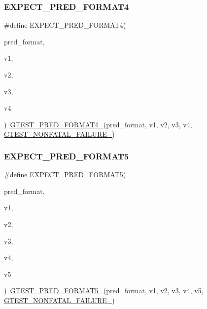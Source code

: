 \subsubsection{\texorpdfstring{EXPECT\_PRED\_FORMAT4}{EXPECT\_PRED\_FORMAT4}}
{\footnotesize\ttfamily \#define E\+X\+P\+E\+C\+T\+\_\+\+P\+R\+E\+D\+\_\+\+F\+O\+R\+M\+A\+T4(\begin{DoxyParamCaption}\item[{}]{pred\+\_\+format,  }\item[{}]{v1,  }\item[{}]{v2,  }\item[{}]{v3,  }\item[{}]{v4 }\end{DoxyParamCaption})~\mbox{\hyperlink{_obj__test_2lib_2googletest-release-1_88_81_2googletest_2include_2gtest_2gtest__pred__impl_8h_abd207ed869491ba4bba29f8df37b7355}{G\+T\+E\+S\+T\+\_\+\+P\+R\+E\+D\+\_\+\+F\+O\+R\+M\+A\+T4\+\_\+}}(pred\+\_\+format, v1, v2, v3, v4, \mbox{\hyperlink{_obj__test_2lib_2googletest-release-1_88_81_2googletest_2include_2gtest_2internal_2gtest-internal_8h_a6cb7482cfa03661a91c698eb5895f642}{G\+T\+E\+S\+T\+\_\+\+N\+O\+N\+F\+A\+T\+A\+L\+\_\+\+F\+A\+I\+L\+U\+R\+E\+\_\+}})}

\mbox{\label{_obj__test_2lib_2googletest-release-1_88_81_2googletest_2include_2gtest_2gtest__pred__impl_8h_a74beddf9661e4460f9969fe211b9e80e}} 
\subsubsection{\texorpdfstring{EXPECT\_PRED\_FORMAT5}{EXPECT\_PRED\_FORMAT5}}
{\footnotesize\ttfamily \#define E\+X\+P\+E\+C\+T\+\_\+\+P\+R\+E\+D\+\_\+\+F\+O\+R\+M\+A\+T5(\begin{DoxyParamCaption}\item[{}]{pred\+\_\+format,  }\item[{}]{v1,  }\item[{}]{v2,  }\item[{}]{v3,  }\item[{}]{v4,  }\item[{}]{v5 }\end{DoxyParamCaption})~\mbox{\hyperlink{_obj__test_2lib_2googletest-release-1_88_81_2googletest_2include_2gtest_2gtest__pred__impl_8h_a107623ee191560f703a3fdc983803c8e}{G\+T\+E\+S\+T\+\_\+\+P\+R\+E\+D\+\_\+\+F\+O\+R\+M\+A\+T5\+\_\+}}(pred\+\_\+format, v1, v2, v3, v4, v5, \mbox{\hyperlink{_obj__test_2lib_2googletest-release-1_88_81_2googletest_2include_2gtest_2internal_2gtest-internal_8h_a6cb7482cfa03661a91c698eb5895f642}{G\+T\+E\+S\+T\+\_\+\+N\+O\+N\+F\+A\+T\+A\+L\+\_\+\+F\+A\+I\+L\+U\+R\+E\+\_\+}})}

